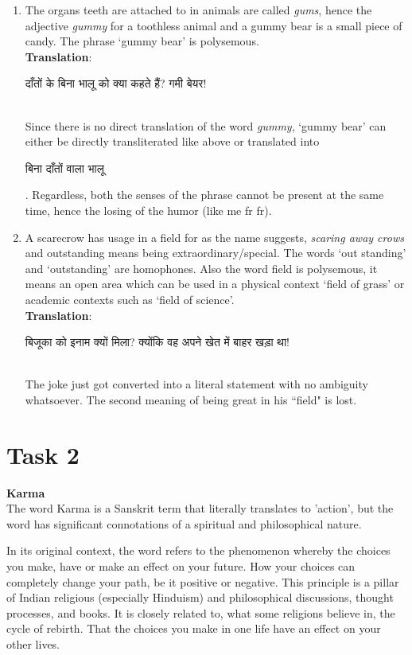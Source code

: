 \documentclass{article}
\begin{document}
\begin{enumerate}
    \item The organs teeth are attached to in animals are called \textit{gums}, hence the adjective \textit{gummy} for a toothless animal and a gummy bear is a small piece of candy. The phrase `gummy bear' is polysemous.
    \medskip\\
    \textbf{Translation}: \begin{hindi}दाँतों के बिना भालू को क्या कहते हैं? गमी बेयर!\end{hindi} \\
    Since there is no direct translation of the word \textit{gummy}, `gummy bear' can either be directly transliterated like above or translated into \begin{hindi}बिना दाँतों वाला भालू\end{hindi}. Regardless, both the senses of the phrase cannot be present at the same time, hence the losing of the humor (like me fr fr).

    \item A scarecrow has usage in a field for as the name suggests, \textit{scaring away crows} and outstanding means being extraordinary/special. The words `out standing' and `outstanding' are homophones. Also the word field is polysemous, it means an open area which can be used in a physical context `field of grass' or academic contexts such as `field of science'.
    \medskip\\
    \textbf{Translation}: \begin{hindi}
        बिजूका को इनाम क्यों मिला? क्योंकि वह अपने खेत में बाहर खड़ा था!
    \end{hindi}\\
    The joke just got converted into a literal statement with no ambiguity whatsoever. The second meaning of being great in his ``field" is lost.
\end{enumerate}

\newpage
\section{Task 2}
\textbf{Karma}\\
The word Karma is a Sanskrit term that literally translates to 'action', but the word has significant connotations of a spiritual and philosophical nature.

In its original context, the word refers to the phenomenon whereby the choices you make, have or make an effect on your future. How your choices can completely change your path, be it positive or negative. This principle is a pillar of Indian religious (especially Hinduism) and philosophical discussions, thought processes, and books. It is closely related to, what some religions believe in, the cycle of rebirth. That the choices you make in one life have an effect on your other lives.
\end{document}
